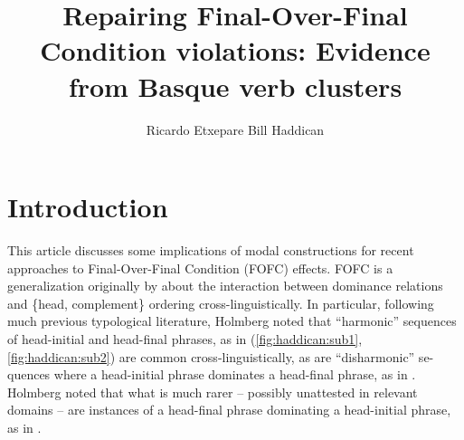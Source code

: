 \documentclass[output=paper]{langscibook}
\title{Repairing Final-Over-Final Condition violations: Evidence from Basque verb clusters}
\author{%
 Ricardo Etxepare\affiliation{IKER UMR 5478-CNRS}\lastand 
 Bill Haddican\affiliation{CUNY, Queens College/Graduate Center}
}
\begin{document}


\section{Introduction} \protect\label{introduction}
This article discusses some implications of  modal constructions for recent approaches to  Final-Over-Final Condition (FOFC) effects.  FOFC is a  generalization originally by \cite{Holmberg2000deriving} about the interaction between dominance relations and \{head, complement\} ordering cross-linguistically.   In particular, following much previous typological literature, Holmberg  noted that  ``harmonic'' sequences of  head-initial and head-final phrases, as in (\ref{fig:haddican:sub1},\ref{fig:haddican:sub2}) are common cross-linguistically, as are ``disharmonic'' se-\linebreak quences where a head-initial phrase dominates a head-final phrase, as in  \citep{hawkins1983, hawkins1995}.  Holmberg noted that what is much rarer -- possibly unattested in relevant domains -- are instances of a head-final phrase dominating a head-initial phrase, as in .
\end{document}
